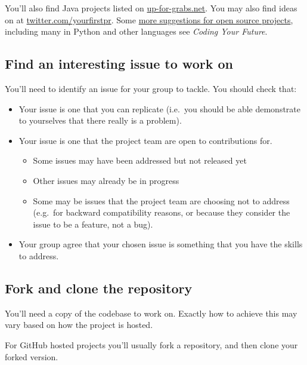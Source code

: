 \documentclass[
]{book}
\providecommand{\tightlist}{%
  \setlength{\itemsep}{0pt}\setlength{\parskip}{0pt}}
\begin{document}
You'll also find Java projects listed on \href{http://up-for-grabs.net}{up-for-grabs.net}. You may also find ideas on at \href{https://twitter.com/yourfirstpr}{twitter.com/yourfirstpr}. Some \href{https://www.cdyf.me/experiencing.html\#opensource}{more suggestions for open source projects}, including many in Python and other languages see \emph{Coding Your Future}. \citep{experiencing}

\hypertarget{findanissue}{%
\subsection{Find an interesting issue to work on}\label{findanissue}}

You'll need to identify an issue for your group to tackle. You should check that:

\begin{itemize}
\tightlist
\item
  Your issue is one that you can replicate (i.e.~you should be able demonstrate to yourselves that there really is a problem).
\item
  Your issue is one that the project team are open to contributions for.

  \begin{itemize}
  \tightlist
  \item
    Some issues may have been addressed but not released yet
  \item
    Other issues may already be in progress
  \item
    Some may be issues that the project team are choosing not to address (e.g.~for backward compatibility reasons, or because they consider the issue to be a feature, not a bug).
  \end{itemize}
\item
  Your group agree that your chosen issue is something that you have the skills to address.
\end{itemize}

\hypertarget{forklone}{%
\subsection{Fork and clone the repository}\label{forklone}}

You'll need a copy of the codebase to work on. Exactly how to achieve this may vary based on how the project is hosted.

For GitHub hosted projects you'll usually fork a repository, and then clone your forked version.
\end{document}
